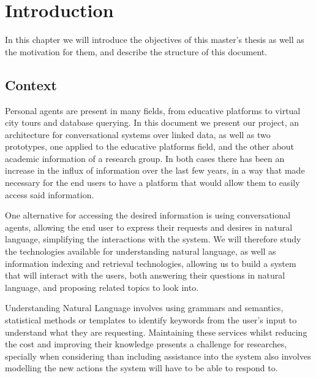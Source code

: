 \chapter{Introduction}
\label{chapter:intro}

\begin{chapterintro}

In this chapter we will introduce the objectives of this master's thesis as well as the motivation for them, and describe the structure of this document.
 
\end{chapterintro}

\cleardoublepage

\section{Context}

Personal agents are present in many fields, from educative platforms\cite{fonte2012intelligent} to virtual city tours\cite{bogdanovych2012the} and database querying\cite{augello2009semantic}. In this document we present our project, an architecture for conversational systems over linked data, as well as two prototypes, one applied to the educative platforms field, and the other about academic information of a research group. In both cases there has been an increase in the influx of information over the last few years, in a way that made necessary for the end users to have a platform that would allow them to easily access said information.

One alternative for accessing the desired information is using conversational agents, allowing the end user to express their requests and desires in natural language, simplifying the interactions with the system. We will therefore study the technologies available for understanding natural language, as well as information indexing and retrieval technologies, allowing us to build a system that will interact with the users, both answering their questions in natural language, and proposing related topics to look into.

Understanding Natural Language involves using grammars and semantics, statistical methods or templates to identify keywords from the user's input to understand what they are requesting. Maintaining these services whilst reducing the cost and improving their knowledge presents a challenge for researches, specially when considering than including assistance into the system also involves modelling the new actions the system will have to be able to respond to.

